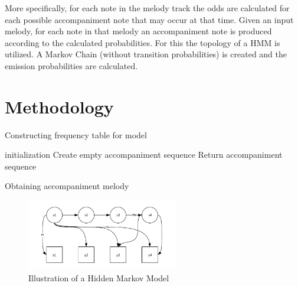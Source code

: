 More specifically, for each note in the melody track the odds are calculated for each possible accompaniment note that may occur at that time. Given an input melody, for each note in that melody an accompaniment note is produced according to the calculated probabilities. For this the topology of a \ac{HMM} is utilized. A Markov Chain (without transition probabilities) is created and the emission probabilities are calculated.

\section{Methodology}
\begin{algorithm}
 \caption{Constructing frequency table for model}
\end{algorithm}

\begin{algorithm}
 initialization\;
 Create empty accompaniment sequence\;
 Return accompaniment sequence\;
 \caption{Obtaining accompaniment melody}
 \label{alg:mm_accomp}
\end{algorithm}

\begin{figure}
\centerline{\includegraphics[width=250px]{../images/hmm_illu.pdf}}
\caption{Illustration of a Hidden Markov Model}
\label{ims:hmm_illu}
\end{figure}

